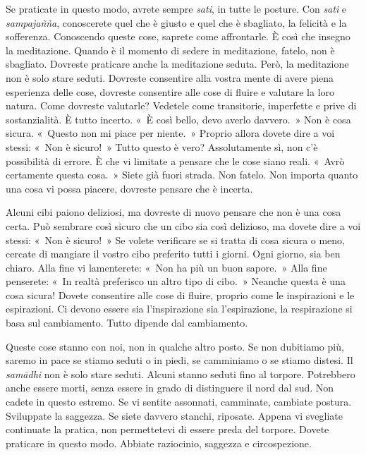 Se praticate in questo modo, avrete sempre \emph{sati}, in tutte le
posture. Con \emph{sati} e \emph{sampajañña}, conoscerete quel che è
giusto e quel che è sbagliato, la felicità e la sofferenza. Conoscendo
queste cose, saprete come affrontarle. È così che insegno la
meditazione. Quando è il momento di sedere in meditazione, fatelo, non è
sbagliato. Dovreste praticare anche la meditazione seduta. Però, la
meditazione non è solo stare seduti. Dovreste consentire alla vostra
mente di avere piena esperienza delle cose, dovreste consentire alle
cose di fluire e valutare la loro natura. Come dovreste valutarle?
Vedetele come transitorie, imperfette e prive di sostanzialità. È tutto
incerto. «~È così bello, devo averlo davvero.~» Non è cosa sicura.
«~Questo non mi piace per niente.~» Proprio allora dovete dire a voi
stessi: «~Non è sicuro!~» Tutto questo è vero? Assolutamente sì, non c'è
possibilità di errore. È che vi limitate a pensare che le cose siano
reali. «~Avrò certamente questa cosa.~» Siete già fuori strada. Non
fatelo. Non importa quanto una cosa vi possa piacere, dovreste pensare
che è incerta.

Alcuni cibi paiono deliziosi, ma dovreste di nuovo pensare che non è una
cosa certa. Può sembrare così sicuro che un cibo sia così delizioso, ma
dovete dire a voi stessi: «~Non è sicuro!~» Se volete verificare se si
tratta di cosa sicura o meno, cercate di mangiare il vostro cibo
preferito tutti i giorni. Ogni giorno, sia ben chiaro. Alla fine vi
lamenterete: «~Non ha più un buon sapore.~» Alla fine penserete: «~In
realtà preferisco un altro tipo di cibo.~» Neanche questa è una cosa
sicura! Dovete consentire alle cose di fluire, proprio come le
inspirazioni e le espirazioni. Ci devono essere sia l'inspirazione sia
l'espirazione, la respirazione si basa sul cambiamento. Tutto dipende
dal cambiamento.

Queste cose stanno con noi, non in qualche altro posto. Se non dubitiamo
più, saremo in pace se stiamo seduti o in piedi, se camminiamo o se
stiamo distesi. Il \emph{samādhi} non è solo stare seduti. Alcuni stanno
seduti fino al torpore. Potrebbero anche essere morti, senza essere in
grado di distinguere il nord dal sud. Non cadete in questo estremo. Se
vi sentite assonnati, camminate, cambiate postura. Sviluppate la
saggezza. Se siete davvero stanchi, riposate. Appena vi svegliate
continuate la pratica, non permettetevi di essere preda del torpore.
Dovete praticare in questo modo. Abbiate raziocinio, saggezza e
circospezione.


